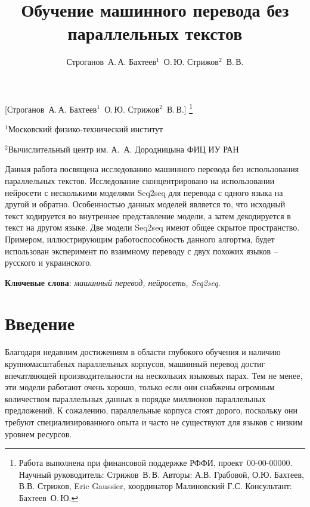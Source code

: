 \documentclass[12pt,twoside]{article}
\begin{document}
\title
    [Обучение машинного перевода без параллельных текстов] %
    {Обучение машинного перевода без параллельных текстов}
\author
    [Строганов~А.\,А. Бахтеев$^1$~О.\,Ю.  Стрижов$^2$~В.\,В.] %
    {Строганов~А.\,А. Бахтеев$^1$~О.\,Ю.  Стрижов$^2$~В.\,В.} %
    [Строганов~А.\,А. Бахтеев$^1$~О.\,Ю.  Стрижов$^2$~В.\,В.] %
\thanks
    {Работа выполнена при финансовой поддержке РФФИ, проект \No\,00-00-00000.
   Научный руководитель:  Стрижов~В.\,В.
   Авторы: А.В. Грабовой, О.Ю. Бахтеев, В.В. Стрижов, Eric Gaussier, координатор Малиновский Г.С.
    Консультант:  Бахтеев~О.\,Ю.}
\organization
     {$^1$Московский физико-технический институт\par
      $^2$Вычислительный центр им. А.~А. Дородницына ФИЦ ИУ РАН}

\abstract
    {Данная работа посвящена исследованию машинного перевода без использования параллельных текстов. Исследование сконцентрировано на использовании нейросети с несколькими моделями Seq2seq для перевода с одного языка на другой и обратно. Особенностью данных моделей является то, что исходный текст кодируется во внутреннее представление модели, а затем декодируется в текст на другом языке. Две модели Seq2seq имеют общее скрытое пространство. Примером, иллюстрирующим работоспособность данного алгортма, будет использован эксперимент по взаимному переводу с двух похожих языков -- русского и украинского.
    
    \bigskip
    \textbf{Ключевые слова}: \emph {машинный перевод, нейросеть, Seq2seq}.}
\maketitle
\section{Введение}
Благодаря недавним достижениям в области глубокого обучения и наличию крупномасштабных параллельных корпусов, машинный перевод достиг впечатляющей производительности на нескольких языковых парах. Тем не менее, эти модели работают очень хорошо, только если они снабжены огромным количеством параллельных данных в порядке миллионов параллельных предложений.
К сожалению, параллельные корпуса стоят дорого, поскольку они требуют специализированного опыта и часто не существуют для языков с низким уровнем ресурсов. 
\end{document}
